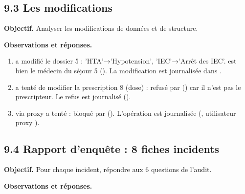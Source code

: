 \subsection{9.3 Les modifications}
\textbf{Objectif.} Analyser les modifications de données et de structure.

\textbf{Observations et réponses.}
\begin{enumerate}
  \item {} a modifié le dossier 5 :  'HTA'→'Hypotension',  'IEC'→'Arrêt des IEC'.  est bien le médecin du séjour 5 (). La modification est journalisée dans .
  \item {} a tenté de modifier la prescription 8 (dose) : refusé par  () car il n'est pas le prescripteur. Le refus est journalisé ().
  \item {} via proxy a tenté  : bloqué par  (). L'opération est journalisée (, utilisateur proxy ).
\end{enumerate}

\subsection{9.4 Rapport d'enquête : 8 fiches incidents}
\textbf{Objectif.} Pour chaque incident, répondre aux 6 questions de l'audit.

\textbf{Observations et réponses.}

